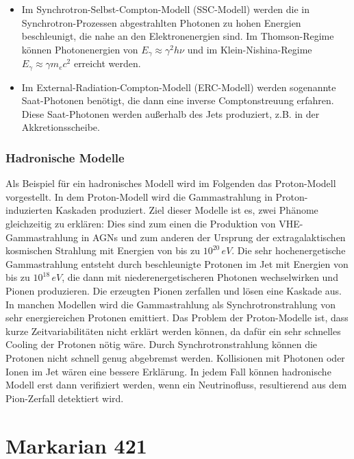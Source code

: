 \begin{itemize}
\item Im Synchrotron-Selbst-Compton-Modell (SSC-Modell) werden die in Synchrotron-Prozessen abgestrahlten Photonen zu hohen Energien beschleunigt, die nahe an den Elektronenergien sind.
Im Thomson-Regime können Photonenergien von $E_{\gamma}\approx \gamma^2 h \nu$ und im Klein-Nishina-Regime $E_{\gamma}\approx \gamma m_e c^2$ erreicht werden.\cite{Weekes}
\item Im External-Radiation-Compton-Modell (ERC-Modell) werden sogenannte Saat-Photonen benötigt, die dann eine inverse Comptonstreuung erfahren.
Diese Saat-Photonen werden außerhalb des Jets produziert, z.B. in der Akkretionsscheibe.\cite{Weekes}
\end{itemize}

\subsubsection{Hadronische Modelle}
Als Beispiel für ein hadronisches Modell wird im Folgenden das Proton-Modell vorgestellt.
In dem Proton-Modell wird die Gammastrahlung in Proton-induzierten Kaskaden produziert. 
Ziel dieser Modelle ist es, zwei Phänome gleichzeitig zu erklären: 
Dies sind zum einen die Produktion von VHE-Gammastrahlung in AGNs und zum anderen der Ursprung der extragalaktischen kosmischen Strahlung mit Energien von bis zu $10^{20}\,\si{eV}$.
Die sehr hochenergetische Gammastrahlung entsteht durch beschleunigte Protonen im Jet mit Energien von bis zu $10^{18}\,\si{eV}$, die dann mit niederenergetischeren Photonen wechselwirken und Pionen produzieren.
Die erzeugten Pionen zerfallen und lösen eine Kaskade aus.
In manchen Modellen wird die Gammastrahlung als Synchrotronstrahlung von sehr energiereichen Protonen emittiert.
Das Problem der Proton-Modelle ist, dass kurze Zeitvariabilitäten nicht erklärt werden können, da dafür ein sehr schnelles Cooling der Protonen nötig wäre. 
Durch Synchrotronstrahlung können die Protonen nicht schnell genug abgebremst werden.
Kollisionen mit Photonen oder Ionen im Jet wären eine bessere Erklärung.
In jedem Fall können hadronische Modell erst dann verifiziert werden, wenn ein Neutrinofluss, resultierend aus dem Pion-Zerfall detektiert wird.\cite{Weekes}


\section{Markarian 421}
\label{sec:Mrk421}

